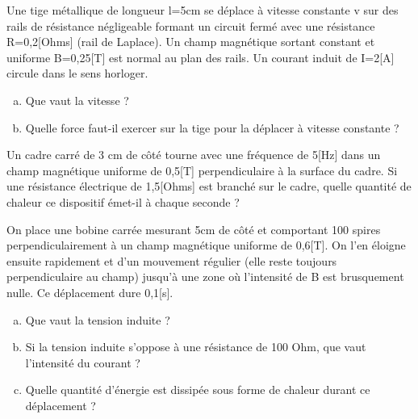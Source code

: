 \begin{exercise}
    Une tige métallique de longueur l=5cm se déplace à vitesse constante v sur des rails de résistance négligeable formant un circuit fermé avec une résistance R=0,2[Ohms] (rail de Laplace). Un champ magnétique sortant constant et uniforme B=0,25[T] est normal au plan des rails. Un courant induit de I=2[A] circule dans le sens horloger.
    \begin{enumerate}[a)]
        \item Que vaut la vitesse ?
        \item Quelle force faut-il exercer sur la tige pour la déplacer à vitesse constante ?
    \end{enumerate}
\end{exercise}

\begin{exercise}
    Un cadre carré de 3 cm de côté tourne avec une fréquence de 5[Hz] dans un champ magnétique uniforme de 0,5[T] perpendiculaire à la surface du cadre. Si une résistance électrique de 1,5[Ohms] est branché sur le cadre, quelle quantité de chaleur ce dispositif émet-il à chaque seconde ?
\end{exercise}

\begin{exercise}
    On place une bobine carrée mesurant 5cm de côté et comportant 100 spires perpendiculairement à un champ magnétique uniforme de 0,6[T]. On l'en éloigne ensuite rapidement et d'un mouvement régulier (elle reste toujours perpendiculaire au champ) jusqu'à une zone où l'intensité de B est brusquement nulle. Ce déplacement dure 0,1[s].

    \begin{enumerate}[a)]
        \item Que vaut la tension induite ?
        \item Si la tension induite s'oppose à une résistance de 100 Ohm, que vaut l'intensité du courant ?
        \item Quelle quantité d'énergie est dissipée sous forme de chaleur durant ce déplacement ?
    \end{enumerate}
\end{exercise}
